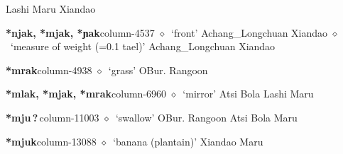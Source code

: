          Lashi 
\hspace{1ex}
         Maru 
\hspace{1ex}
         Xiandao 
  \item {\footnotesize \textbf{*njak, *mjak, *ɲak}}{\tiny column-4537}
         $\diamond$~`front'
         Achang\_Longchuan 
\hspace{1ex}
         Xiandao 
\hspace{1ex}
         $\diamond$~`measure of weight (=0.1 tael)'
         Achang\_Longchuan 
\hspace{1ex}
         Xiandao 
  \item {\footnotesize \textbf{*mrak}}{\tiny column-4938}
         $\diamond$~`grass'
         OBur. 
\hspace{1ex}
         Rangoon 
  \item {\footnotesize \textbf{*mlak, *mjak, *mrak}}{\tiny column-6960}
         $\diamond$~`mirror'
         Atsi 
\hspace{1ex}
         Bola 
\hspace{1ex}
         Lashi 
\hspace{1ex}
         Maru 
  \item {\footnotesize \textbf{*mju\,?\,}}{\tiny column-11003}
         $\diamond$~`swallow'
         OBur. 
\hspace{1ex}
         Rangoon 
\hspace{1ex}
         Atsi 
\hspace{1ex}
         Bola 
\hspace{1ex}
         Maru 
  \item {\footnotesize \textbf{*mjuk}}{\tiny column-13088}
         $\diamond$~`banana (plantain)'
         Xiandao 
\hspace{1ex}
         Maru 
\hspace{1ex}
